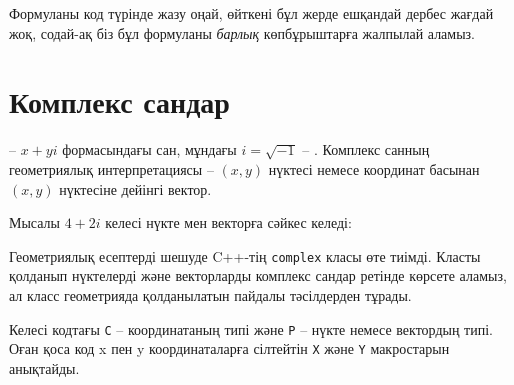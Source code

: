 Формуланы код түрінде жазу оңай, өйткені бұл жерде 
ешқандай дербес жағдай жоқ, содай-ақ біз бұл формуланы
\emph{барлық} көпбұрыштарға жалпылай аламыз.

\section{Комплекс сандар}


 -- $x+y i$ формасындағы сан, 
мұндағы $i = \sqrt{-1}$ -- . 
Комплекс санның геометриялық интерпретациясы --
$(x,y)$ нүктесі немесе координат басынан $(x,y)$ нүктесіне 
дейінгі вектор. 


Мысалы $4+2i$ келесі нүкте мен векторға сәйкес келеді:

\begin{center}
\end{center}


Геометриялық есептерді шешуде C++-тің \texttt{complex} класы өте тиімді. 
Класты қолданып нүктелерді және векторларды 
комплекс сандар ретінде көрсете аламыз, ал класс 
геометрияда қолданылатын пайдалы тәсілдерден тұрады. 


Келесі кодтағы \texttt{C} -- координатаның типі және 
\texttt{P} -- нүкте немесе вектордың типі. Оған қоса
код x пен y координаталарға сілтейтін \texttt{X} және \texttt{Y}
макростарын анықтайды.

